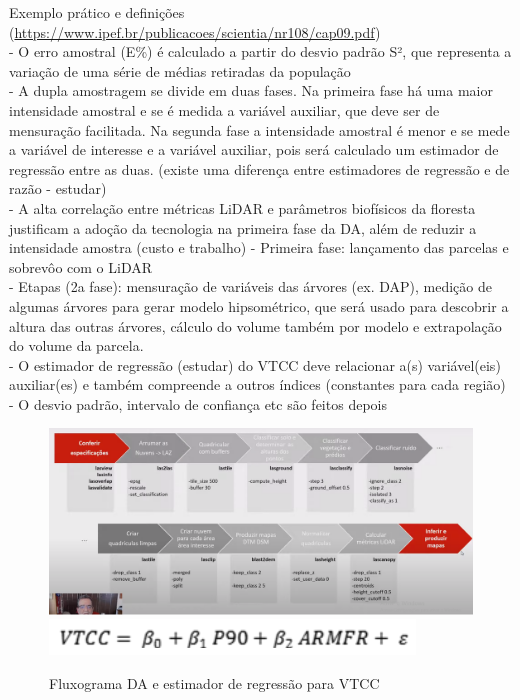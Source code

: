 \documentclass[
]{article}
\begin{document}
Exemplo prático e definições
(\url{https://www.ipef.br/publicacoes/scientia/nr108/cap09.pdf})\\
- O erro amostral (E\%) é calculado a partir do desvio padrão S², que
representa a variação de uma série de médias retiradas da população\\
- A dupla amostragem se divide em duas fases. Na primeira fase há uma
maior intensidade amostral e se é medida a variável auxiliar, que deve
ser de mensuração facilitada. Na segunda fase a intensidade amostral é
menor e se mede a variável de interesse e a variável auxiliar, pois será
calculado um estimador de regressão entre as duas. (existe uma diferença
entre estimadores de regressão e de razão - estudar)\\
- A alta correlação entre métricas LiDAR e parâmetros biofísicos da
floresta justificam a adoção da tecnologia na primeira fase da DA, além
de reduzir a intensidade amostra (custo e trabalho) - Primeira fase:
lançamento das parcelas e sobrevôo com o LiDAR\\
- Etapas (2a fase): mensuração de variáveis das árvores (ex. DAP),
medição de algumas árvores para gerar modelo hipsométrico, que será
usado para descobrir a altura das outras árvores, cálculo do volume
também por modelo e extrapolação do volume da parcela.\\
- O estimador de regressão (estudar) do VTCC deve relacionar a(s)
variável(eis) auxiliar(es) e também compreende a outros índices
(constantes para cada região)\\
- O desvio padrão, intervalo de confiança etc são feitos depois

\begin{figure}

{\centering \includegraphics[width=0.45\linewidth]{IMAGES/fluxograma-funcoes} \includegraphics[width=0.45\linewidth]{IMAGES/eq-estimador-regressao} 

}

\caption{Fluxograma DA e estimador de regressão para VTCC}\label{fig:unnamed-chunk-6}
\end{figure}
\end{document}
